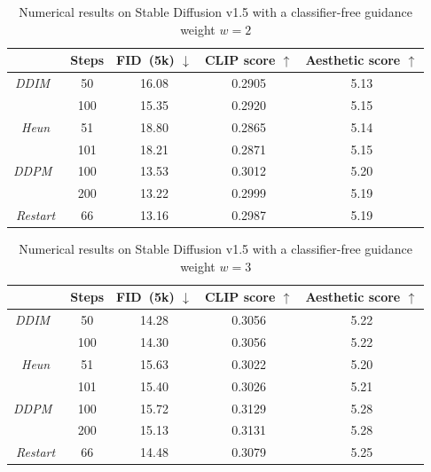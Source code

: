 \begin{table}[H]
    \centering
    \caption{Numerical results on Stable Diffusion v1.5 with a classifier-free guidance weight $w=2$}
    \begin{tabular}{c c c c c}
        \toprule
         & Steps & FID~(5k) $\downarrow$ & CLIP score $\uparrow$& Aesthetic score $\uparrow$ \\
          \midrule
\textit{DDIM}~\cite{Song2020DenoisingDI} 
    & 50 & 16.08 & 0.2905 & 5.13\\
    &100 & 15.35 & 0.2920 & 5.15\\
          \midrule
          \textit{Heun} & 51 & 18.80 & 0.2865 & 5.14\\
    &101 & 18.21 & 0.2871 & 5.15\\
    \midrule
\textit{DDPM}~\cite{Ho2020DenoisingDP} & 100 & 13.53 & {0.3012} & {5.20}\\
        & 200 & 13.22 & 0.2999 & 5.19\\
        \midrule
        \textit{Restart} & 66 & {13.16}& 0.2987 & 5.19 \\
        \bottomrule
    \end{tabular}
    \label{tab:w=2}
\end{table}

\begin{table}[H]
    \centering
    \caption{Numerical results on Stable Diffusion v1.5 with a classifier-free guidance weight $w=3$}
    \begin{tabular}{c c c c c}
        \toprule
         & Steps & FID~(5k) $\downarrow$ & CLIP score $\uparrow$& Aesthetic score $\uparrow$ \\
          \midrule
\textit{DDIM}~\cite{Song2020DenoisingDI} 
    & 50 & 14.28 & 0.3056 & 5.22\\
    &100 & 14.30 & 0.3056 & 5.22\\
          \midrule
          \textit{Heun} & 51 & 15.63 & 0.3022 & 5.20\\
    &101 & 15.40 & 0.3026 & 5.21\\
    \midrule
\textit{DDPM}~\cite{Ho2020DenoisingDP} & 100 & 15.72 & 0.3129 & 5.28\\
        & 200 & 15.13 & {0.3131} & {5.28}\\
        \midrule
        \textit{Restart} & 66 & {14.48} & 0.3079 & 5.25 \\
        \bottomrule
    \end{tabular}
    \label{tab:w=3}
\end{table}

